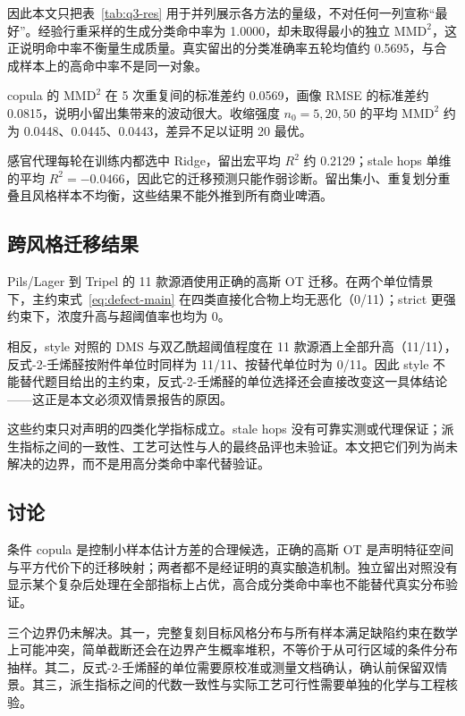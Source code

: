 \documentclass[UTF8,a4paper,zihao=-4]{ctexart}
\numberwithin{figure}{section}
\numberwithin{table}{section}
\numberwithin{equation}{section}
\begin{document}
因此本文只把表~\ref{tab:q3-res} 用于并列展示各方法的量级，不对任何一列宣称“最好”。经验行重采样的生成分类命中率为 1.0000，却未取得最小的独立 $\mathrm{MMD}^{2}$，这正说明命中率不衡量生成质量。真实留出的分类准确率五轮均值约 0.5695，与合成样本上的高命中率不是同一对象。

copula 的 $\mathrm{MMD}^{2}$ 在 5 次重复间的标准差约 0.0569，画像 RMSE 的标准差约 0.0815，说明小留出集带来的波动很大。收缩强度 $n_0=5,20,50$ 的平均 $\mathrm{MMD}^{2}$ 约为 0.0448、0.0445、0.0443，差异不足以证明 20 最优。

感官代理每轮在训练内都选中 Ridge，留出宏平均 $R^2$ 约 0.2129；stale hops 单维的平均 $R^2=-0.0466$，因此它的迁移预测只能作弱诊断。留出集小、重复划分重叠且风格样本不均衡，这些结果不能外推到所有商业啤酒。

\subsection{跨风格迁移结果}

Pils/Lager 到 Tripel 的 11 款源酒使用正确的高斯 OT 迁移。在两个单位情景下，主约束式~\eqref{eq:defect-main} 在四类直接化合物上均无恶化（0/11）；strict 更强约束下，浓度升高与超阈值率也均为 0。

相反，style 对照的 DMS 与双乙酰超阈值程度在 11 款源酒上全部升高（11/11），反式-2-壬烯醛按附件单位时同样为 11/11、按替代单位时为 0/11。因此 style 不能替代题目给出的主约束，反式-2-壬烯醛的单位选择还会直接改变这一具体结论——这正是本文必须双情景报告的原因。

这些约束只对声明的四类化学指标成立。stale hops 没有可靠实测或代理保证；派生指标之间的一致性、工艺可达性与人的最终品评也未验证。本文把它们列为尚未解决的边界，而不是用高分类命中率代替验证。

\subsection{讨论}

条件 copula 是控制小样本估计方差的合理候选，正确的高斯 OT 是声明特征空间与平方代价下的迁移映射；两者都不是经证明的真实酿造机制。独立留出对照没有显示某个复杂后处理在全部指标上占优，高合成分类命中率也不能替代真实分布验证。

三个边界仍未解决。其一，完整复刻目标风格分布与所有样本满足缺陷约束在数学上可能冲突，简单截断还会在边界产生概率堆积，不等价于从可行区域的条件分布抽样。其二，反式-2-壬烯醛的单位需要原校准或测量文档确认，确认前保留双情景。其三，派生指标之间的代数一致性与实际工艺可行性需要单独的化学与工程核验。
\end{document}
